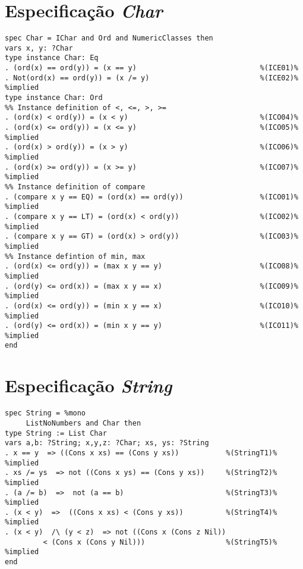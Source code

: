 \section{Especificação \textit{Char}}
\label{appendix:lazySpec:char}
\begin{Verbatim}
spec Char = IChar and Ord and NumericClasses then
vars x, y: ?Char
type instance Char: Eq
. (ord(x) == ord(y)) = (x == y)                             %(ICE01)%
. Not(ord(x) == ord(y)) = (x /= y)                          %(ICE02)% %implied
type instance Char: Ord
%% Instance definition of <, <=, >, >=
. (ord(x) < ord(y)) = (x < y)                               %(ICO04)%
. (ord(x) <= ord(y)) = (x <= y)                             %(ICO05)% %implied
. (ord(x) > ord(y)) = (x > y)                               %(ICO06)% %implied
. (ord(x) >= ord(y)) = (x >= y)                             %(ICO07)% %implied
%% Instance definition of compare
. (compare x y == EQ) = (ord(x) == ord(y))                  %(ICO01)% %implied
. (compare x y == LT) = (ord(x) < ord(y))                   %(ICO02)% %implied
. (compare x y == GT) = (ord(x) > ord(y))                   %(ICO03)% %implied
%% Instance defintion of min, max
. (ord(x) <= ord(y)) = (max x y == y)                       %(ICO08)% %implied
. (ord(y) <= ord(x)) = (max x y == x)                       %(ICO09)% %implied
. (ord(x) <= ord(y)) = (min x y == x)                       %(ICO10)% %implied
. (ord(y) <= ord(x)) = (min x y == y)                       %(ICO11)% %implied
end
\end{Verbatim}

\section{Especificação \textit{String}}
\label{appendix:lazySpec:string}
\begin{Verbatim}
spec String = %mono
     ListNoNumbers and Char then
type String := List Char
vars a,b: ?String; x,y,z: ?Char; xs, ys: ?String
. x == y  => ((Cons x xs) == (Cons y xs))           %(StringT1)% %implied
. xs /= ys  => not ((Cons x ys) == (Cons y xs))     %(StringT2)% %implied
. (a /= b)  =>  not (a == b)                        %(StringT3)% %implied
. (x < y)  =>  ((Cons x xs) < (Cons y xs))          %(StringT4)% %implied
. (x < y)  /\ (y < z)  => not ((Cons x (Cons z Nil)) 
         < (Cons x (Cons y Nil)))                   %(StringT5)% %implied
end
\end{Verbatim}

